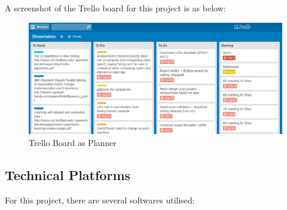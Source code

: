 A screenshot of the Trello board for this project is as below:

\begin{figure}[h]
    \centering
    \includegraphics[width=5.5in]{figures/trello}
    \caption[Trello Board as Planner]{Trello Board as Planner}
    \label{fig:figure4_7}
\end{figure}


\subsection{Technical Platforms}

For this project, there are several softwares utilised:

